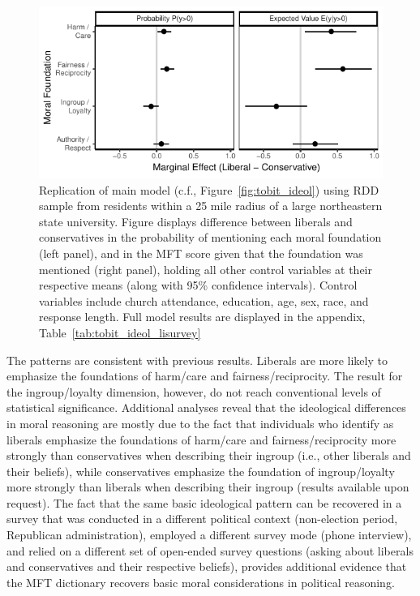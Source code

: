 \documentclass[12pt]{article}
\begin{document}
\begin{figure}[ht]\centering
\includegraphics{../calc/fig/tobit_ideol_lisurvey.pdf}
\caption{Replication of main model (c.f., Figure~\ref{fig:tobit_ideol}) using RDD sample from residents within a 25 mile radius of a large northeastern  state university. Figure displays difference between liberals and conservatives in the probability of mentioning each moral foundation (left panel), and in the MFT score given that the foundation was mentioned (right panel), holding all other control variables at their respective means (along with 95\% confidence intervals). Control variables include church attendance, education, age, sex, race, and response length. Full model results are displayed in the appendix, Table~\ref{tab:tobit_ideol_lisurvey}
}\label{fig:tobit_ideol_lisurvey}
\end{figure}

The patterns are consistent with previous results. Liberals are more likely to emphasize the foundations of harm/care and fairness/reciprocity. The result for the ingroup/loyalty dimension, however, do not reach conventional levels of statistical significance. Additional analyses reveal that the ideological differences in moral reasoning are mostly due to the fact that individuals who identify as liberals emphasize the foundations of harm/care and fairness/reciprocity more strongly than conservatives when describing their ingroup (i.e., other liberals and their beliefs), while conservatives emphasize the foundation of ingroup/loyalty more strongly than liberals when describing their ingroup (results available upon request). The fact that the same basic ideological pattern can be recovered in a survey that was conducted in a different political context (non-election period, Republican administration), employed a different survey mode (phone interview), and relied on a different set of open-ended survey questions (asking about liberals and conservatives and their respective beliefs), provides additional evidence that the MFT dictionary recovers basic moral considerations in political reasoning.
\end{document}

